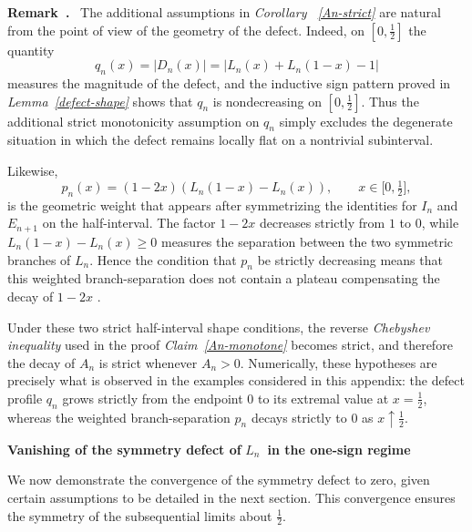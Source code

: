 \documentclass[onecolumn]{article}
\newenvironment{remark}{  \refstepcounter{theorem}  \par\medskip\noindent\textbf{Remark~\thetheorem.}\rmfamily\ }{\par\medskip}
\begin{document}
\begin{remark}
\label{strict-mon-remark} The additional assumptions in \textit{Corollary~%
\ref{An-strict}} are natural from the point of view of the geometry of the
defect. Indeed, on $[0,\tfrac{1}{2}]$ the quantity 
\begin{equation}
q_{n}(x)=|D_{n}(x)|=|L_{n}(x)+L_{n}(1-x)-1|  \label{1270}
\end{equation}%
measures the magnitude of the defect, and the inductive sign pattern proved
in \textit{Lemma~\ref{defect-shape}} shows that $q_{n}$ is nondecreasing on $%
[0,\tfrac{1}{2}]$. Thus the additional strict monotonicity assumption on $%
q_{n}$ simply excludes the degenerate situation in which the defect remains
locally flat on a nontrivial subinterval.

Likewise, 
\begin{equation}
p_{n}(x)=(1-2x)(L_{n}(1-x)-L_{n}(x)),\qquad x\in \lbrack 0,\tfrac{1}{2}],
\label{1271}
\end{equation}%
is the geometric weight that appears after symmetrizing the identities for $%
I_{n}$ and $E_{n+1}$ on the half-interval. The factor $1-2x$ decreases
strictly from $1$ to $0$, while $L_{n}(1-x)-L_{n}(x)\geq 0$ measures the
separation between the two symmetric branches of $L_{n}$. Hence the
condition that $p_{n}$ be strictly decreasing means that this weighted
branch-separation does not contain a plateau compensating the decay of $1-2x$%
.

Under these two strict half-interval shape conditions, the reverse \textit{%
Chebyshev inequality} used in the proof \textit{Claim~\ref{An-monotone}}
becomes strict, and therefore the decay of $A_{n}$ is strict whenever $%
A_{n}>0$. Numerically, these hypotheses are precisely what is observed in
the examples considered in this appendix: the defect profile $q_{n}$ grows
strictly from the endpoint $0$ to its extremal value at $x=\tfrac{1}{2}$,
whereas the weighted branch-separation $p_{n}$ decays strictly to $0$ as $%
x\uparrow \tfrac{1}{2}$.
\end{remark}

\begin{flushleft}
\textbf{Vanishing of the symmetry defect of }$L_{n}$\textbf{\ in the
one-sign regime }
\end{flushleft}

We now demonstrate the convergence of the symmetry defect to zero, given
certain assumptions to be detailed in the next section. This convergence
ensures the symmetry of the subsequential limits about $\frac{1}{2}$.
\end{document}
